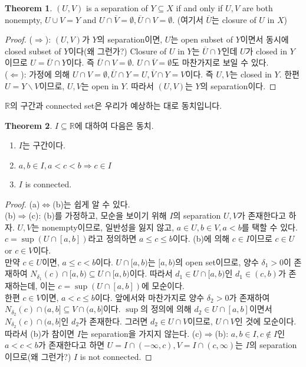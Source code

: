 \documentclass[12pt]{article}
\theoremstyle{definition}
\newtheorem{thm}{Theorem}[section]
\def\RR{\mathbb{R}}
\begin{document}
	\begin{thm} \label{conn def}
		\((U, V)\) is a separation of \(Y \subseteq X\) if and only if \(U, V\) are both nonempty, \(U \cup V = Y\) and \(U \cap \overline{V} = \emptyset, \overline{U} \cap V = \emptyset\). (여기서 \(\overline{U}\)는 closure of \(U\) in \(X\))
	\end{thm}
	\begin{proof}
		($\Rightarrow$): \((U, V)\)가 \(Y\)의 separation이면, \(U\)는 open subset of \(Y\)이면서 동시에 closed subset of \(Y\)이다(왜 그런가?) Closure of \(U\) in \(Y\)는 \(\overline{U} \cap Y\)인데 \(U\)가 closed in \(Y\)이므로 \(U = \overline{U} \cap Y\)이다. 즉 \(\overline{U} \cap V = \emptyset\). \(U \cap \overline{V} = \emptyset\)도 마찬가지로 보일 수 있다.\\
		($\Leftarrow$): 가정에 의해 \(U \cap V = \emptyset, \overline{U} \cap Y = U, \overline{V} \cap Y = V\)이다. 즉 \(U, V\)는 closed in \(Y\). 한편 \(U = Y \backslash V\)이므로, \(U, V\)는 open in \(Y\). 따라서 \((U, V)\)는 \(Y\)의 separation이다.
	\end{proof}

\(\RR\)의 구간과 connected set은 우리가 예상하는 대로 동치입니다.

	\begin{thm}
		\(I \subseteq \RR\)에 대하여 다음은 동치.
		\begin{enumerate}[label=(\alph*), leftmargin=2\parindent]
			\item
			\(I\)는 구간이다.
			\item
			\(a, b \in I, a < c < b \Rightarrow c \in I\)
			\item
			\(I\) is connected.
		\end{enumerate}	
	\end{thm}
	\begin{proof}
		(a)$\Leftrightarrow$(b)는 쉽게 알 수 있다.\\
		(b)$\Rightarrow$(c): (b)를 가정하고, 모순을 보이기 위해 \(I\)의 separation \(U, V\)가 존재한다고 하자. \(U, V\)는 nonempty이므로, 일반성을 잃지 않고, \(a \in U, b \in V, a < b\)를 택할 수 있다. \(c = \sup (U \cap [a, b])\)라고 정의하면 \(a \le c \le b\)이다. (b)에 의해 \(c \in I\)이므로 \(c \in U\) or \(c \in V\)이다.\\
		만약 \(c \in U\)이면, \(a \le c < b\)이다. \(U \cap [a, b)\)는 \([a, b)\)의 open set이므로, 양수 \(\delta_1 > 0\)이 존재하여 \(N_{\delta_1}(c) \cap [a, b) \subseteq U \cap [a, b)\)이다. 따라서 \(d_1 \in U \cap [a, b)\)인 \(d_1 \in (c, b)\)가 존재하는데, 이는 \(c = \sup (U \cap [a, b])\)에 모순이다.\\
		한편 \(c \in V\)이면, \(a < c \le b\)이다. 앞에서와 마찬가지로 양수 \(\delta_2 > 0\)가 존재하여 \(N_{\delta_2}(c) \cap (a, b] \subseteq V \cap (a, b]\)이다. \(\sup\)의 정의에 의해 \(d_2 \in U \cap [a, b]\)이면서 \(N_{\delta_2}(c) \cap (a, b]\)인 \(d_2\)가 존재한다. 그러면 \(d_2 \in U \cap V\)이므로, \(U \cap V\)인 것에 모순이다. 따라서 (b)가 참이면 \(I\)는 separation을 가지지 않는다.
		(c)$\Rightarrow$(b): \(a, b \in I, c \notin I\)인 \(a < c < b\)가 존재한다고 하면 \(U = I \cap (-\infty, c), V = I \cap (c, \infty)\)는 \(I\)의 separation이므로(왜 그런가?) \(I\) is not connected.
	\end{proof}
	
\end{document}

